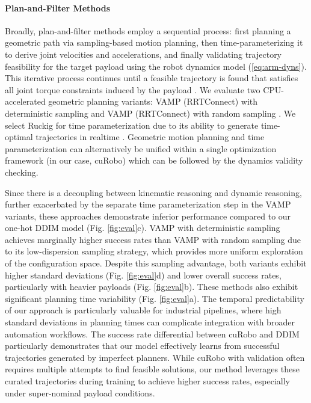 \paragraph{Plan-and-Filter Methods}

Broadly, plan-and-filter methods employ a sequential process: first planning a geometric path via sampling-based motion planning, then time-parameterizing it to derive joint velocities and accelerations, and finally validating trajectory feasibility for the target payload using the robot dynamics model (\cref{eq:arm-dyns}).
This iterative process continues until a feasible trajectory is found that satisfies all joint torque constraints induced by the payload \cite{abderezaei2024clutter}.
We evaluate two CPU-accelerated geometric planning variants: VAMP (RRTConnect) with deterministic sampling and VAMP (RRTConnect) with random sampling \cite{thomason2024motions}. We select Ruckig for time parameterization due to its ability to generate time-optimal trajectories in realtime \cite{berscheid2021jerk}.
Geometric motion planning and time parameterization can alternatively be unified within a single optimization framework (in our case, cuRobo) which can be followed by the dynamics validity checking.

Since there is a decoupling between kinematic reasoning and dynamic reasoning, further exacerbated by the separate time parameterization step in the VAMP variants, these approaches demonstrate inferior performance compared to our one-hot DDIM model (Fig. \ref{fig:eval}c).
VAMP with deterministic sampling achieves marginally higher success rates than VAMP with random sampling due to its low-dispersion sampling strategy, which provides more uniform exploration of the configuration space.
Despite this sampling advantage, both variants exhibit higher standard deviations (Fig. \ref{fig:eval}d) and lower overall success rates, particularly with heavier payloads (Fig. \ref{fig:eval}b). These methods also exhibit significant planning time variability (Fig. \ref{fig:eval}a).
The temporal predictability of our approach is particularly valuable for industrial pipelines, where high standard deviations in planning times can complicate integration with broader automation workflows.
The success rate differential between cuRobo and DDIM particularly demonstrates that our model effectively learns from successful trajectories generated by imperfect planners. While cuRobo with validation often requires multiple attempts to find feasible solutions, our method leverages these curated trajectories during training to achieve higher success rates, especially under super-nominal payload conditions.

